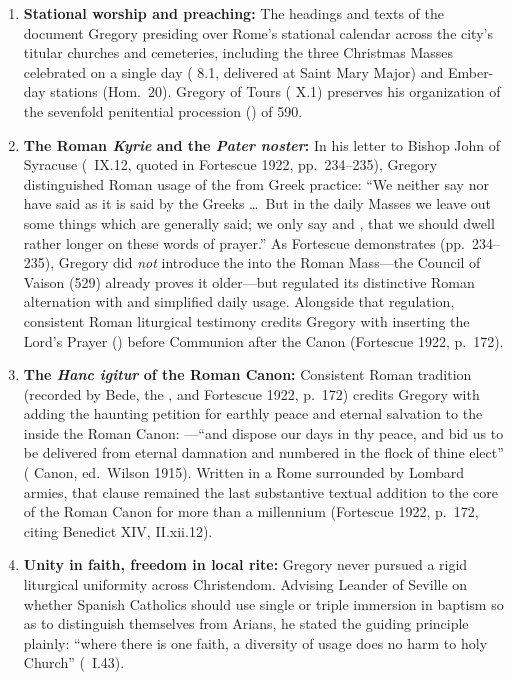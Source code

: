 \begin{enumerate}
\item \textbf{Stational worship and preaching:} The headings and texts of the
 document Gregory presiding over Rome's
stational calendar across the city's titular churches and cemeteries, including
the three Christmas Masses celebrated on a single day ( 8.1, delivered at Saint Mary Major) and Ember-day stations
(Hom.\ 20). Gregory of Tours ( X.1) preserves his
organization of the sevenfold penitential procession () of 590.
\item \textbf{The Roman \emph{Kyrie} and the \emph{Pater noster}:}
In his letter to Bishop John of Syracuse (\ IX.12, quoted in
Fortescue 1922, pp.\ 234--235), Gregory distinguished Roman usage of the
 from Greek practice: ``We neither say nor have said
 as it is said by the Greeks \dots\ But in the daily
Masses we leave out some things which are generally said; we only say
 and , that we should dwell rather
longer on these words of prayer.'' As Fortescue demonstrates (pp.\ 234--235),
Gregory did \emph{not} introduce the  into the Roman Mass---the
Council of Vaison (529) already proves it older---but regulated its distinctive
Roman alternation with  and simplified daily usage.
Alongside that regulation, consistent Roman liturgical testimony credits
Gregory with inserting the Lord's Prayer () before
Communion after the Canon (Fortescue 1922, p.\ 172).
\item \textbf{The \emph{Hanc igitur} of the Roman Canon:} Consistent Roman
tradition (recorded by Bede, the , and Fortescue
1922, p.\ 172) credits Gregory with adding the haunting petition for earthly
peace and eternal salvation to the  inside the Roman Canon:
---``and dispose our days
in thy peace, and bid us to be delivered from eternal damnation and numbered in
the flock of thine elect'' ( Canon, ed.\ Wilson 1915).
Written in a Rome surrounded by Lombard armies, that clause remained the last
substantive textual addition to the core of the Roman Canon for more than a
millennium (Fortescue 1922, p.\ 172, citing Benedict XIV,  II.xii.12).
\item \textbf{Unity in faith, freedom in local rite:} Gregory never pursued a
rigid liturgical uniformity across Christendom. Advising Leander of Seville on
whether Spanish Catholics should use single or triple immersion in baptism so
as to distinguish themselves from Arians, he stated the guiding principle
plainly: ``where there is one faith, a diversity of usage does no harm to holy
Church'' (\ I.43).
\end{enumerate}


